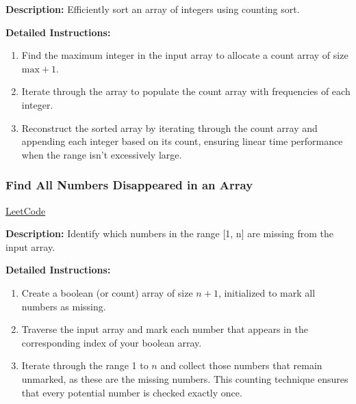 \textbf{Description:} Efficiently sort an array of integers using counting sort.

\textbf{Detailed Instructions:}
\begin{enumerate}
    \item Find the maximum integer in the input array to allocate a count array of size \(\text{max}+1\).
    \item Iterate through the array to populate the count array with frequencies of each integer.
    \item Reconstruct the sorted array by iterating through the count array and appending each integer based on its count, ensuring linear time performance when the range isn’t excessively large.
\end{enumerate}

\subsubsection{Find All Numbers Disappeared in an Array}
\href{https://leetcode.com/problems/find-all-numbers-disappeared-in-an-array/}{LeetCode}

\textbf{Description:} Identify which numbers in the range [1, n] are missing from the input array.

\textbf{Detailed Instructions:}
\begin{enumerate}
    \item Create a boolean (or count) array of size \(n+1\), initialized to mark all numbers as missing.
    \item Traverse the input array and mark each number that appears in the corresponding index of your boolean array.
    \item Iterate through the range 1 to \(n\) and collect those numbers that remain unmarked, as these are the missing numbers. This counting technique ensures that every potential number is checked exactly once.
\end{enumerate}